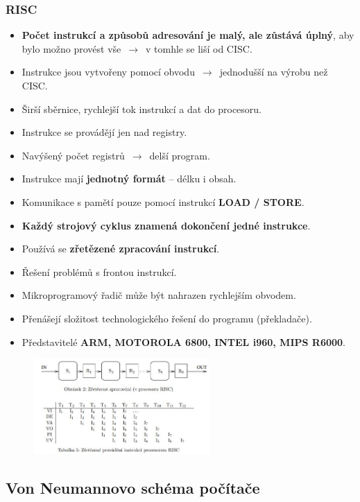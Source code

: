 \subsubsection{RISC}
\begin{itemize}
\item {\textbf{Počet instrukcí a způsobů adresování je malý, ale zůstává úplný}, aby bylo možno provést vše $\,\to\,$ v tomhle se liší od CISC}.
\item {Instrukce jsou vytvořeny pomocí obvodu $\,\to\,$ jednodušší na výrobu než CISC}.
\item {Širší sběrnice, rychlejší tok instrukcí a dat do procesoru}.
\item {Instrukce se provádějí jen nad registry}.
\item {Navýšený počet registrů $\,\to\,$ delší program}.
\item {Instrukce mají \textbf{jednotný formát} -- délku i obsah}.
\item {Komunikace s pamětí pouze pomocí instrukcí \textbf{LOAD / STORE}}.
\item {\textbf{Každý strojový cyklus znamená dokončení jedné instrukce}}.
\item {Používá se \textbf{zřetězené zpracování instrukcí}}.
\item {Řešení problémů s frontou instrukcí}.
\item {Mikroprogramový řadič může být nahrazen rychlejším obvodem}.
\item {Přenášejí složitost technologického řešení do programu (překladače)}.
\item {Představitelé \textbf{ARM, MOTOROLA 6800, INTEL i960, MIPS R6000}}.
\end{itemize}
\begin{figure}[H]
\centering
\includegraphics[width=0.6\textwidth]{assets/1_risc_zretezeni}
\end{figure}

\subsection{Von Neumannovo schéma počítače}

